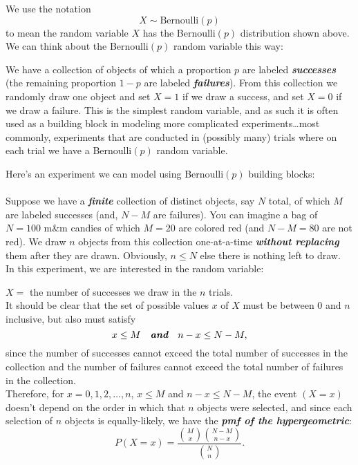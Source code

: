 \documentclass[12pt]{article}
\begin{document}
 We use the notation
$$X\sim \mbox{Bernoulli}(p)$$
to mean the random variable $X$ has the Bernoulli$(p)$ distribution shown above.\\

\noindent We can think about the Bernoulli$(p)$ random variable this way:

We have a collection of objects of which a proportion $p$ are
labeled {\bf\em successes} (the remaining proportion $1-p$ are labeled {\bf\em failures}).
From this collection we randomly draw one object and set $X=1$
if we draw a success, and set $X=0$ if we draw a failure. This is
the simplest random variable, and
as such it is often used as a building block in modeling more
complicated experiments\dots most commonly, experiments that are
conducted in (possibly many) trials where on each trial we have a
Bernoulli$(p)$ random variable.\\





\newpage


\noindent Here's an experiment we can model using Bernoulli$(p)$ building blocks:\\

\label{d:hypergeom}\\
Suppose we have a {\bf\em finite} collection of distinct objects, say $N$ total, of which $M$ are labeled successes (and, $N-M$ are failures).
You can imagine a bag of $N=100$ m\&m candies of which $M=20$ are colored red (and $N-M=80$ are not red).  We draw $n$ objects from this
collection one-at-a-time {\bf\em without replacing} them after they are drawn. Obviously, $n\le N$ else there is nothing left to draw.\\


\noindent In this experiment, we are interested in the random variable:

$X=$ the number of successes we draw in the $n$ trials.\\

\noindent It should be clear that the set of possible values $x$ of $X$ must be between 0 and $n$ inclusive, but also must satisfy
$$x\le M\quad\mbox{\bf\em and}\quad n-x\le N-M,$$
since the number of successes cannot exceed the total number of successes in the collection
and the number of failures cannot exceed the total number of failures in the collection.\\

\noindent Therefore, for $x=0,1,2,\dots,n$, $x\le M$ and $n-x\le N-M$, the event $(X=x)$ doesn't depend on the order in which that $n$ objects were selected, and
since each selection of $n$ objects is equally-likely, we have the {\bf\em pmf of the hypergeometric}:
$$P(X=x) = \dfrac {{M\choose x}{N-M\choose n-x}}{{N\choose n}}.$$
\end{document}
